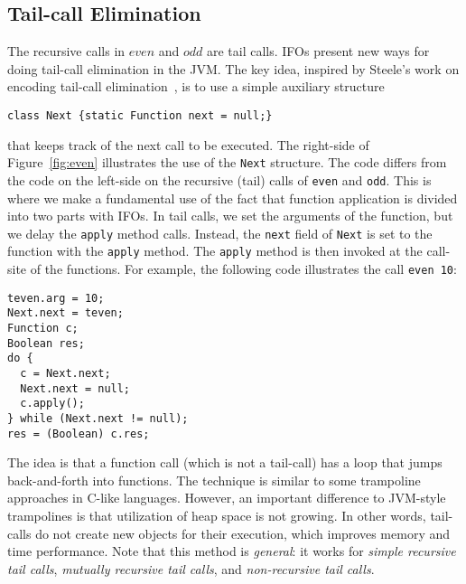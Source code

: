\subsection{Tail-call Elimination}

The recursive calls in $even$ and $odd$ are tail calls. 
IFOs present new ways for doing tail-call elimination in the JVM.
The key idea, inspired by Steele's work on encoding tail-call
elimination~\cite{Steele1978}, is to use a simple
auxiliary structure

\begin{lstlisting}
class Next {static Function next = null;}
\end{lstlisting}

\noindent that keeps track of the next call to be executed.  The
right-side of Figure~\ref{fig:even} illustrates the use of the
\lstinline{Next} structure. The code differs from the code on the
left-side on the recursive (tail) calls of \lstinline{even}
and \lstinline{odd}. This is where we make a fundamental use of the fact
that function application is divided into two parts with IFOs.
In tail calls, we set the arguments of the
function, but we delay the \lstinline{apply} method calls.
Instead, the \lstinline{next} field of \lstinline{Next} is set
to the function with the \lstinline{apply} method. The \lstinline{apply}
method is then invoked at the call-site of the functions. For example, 
the following code illustrates the call \lstinline{even 10}:

\begin{lstlisting}
teven.arg = 10;
Next.next = teven;
Function c;
Boolean res;
do {
  c = Next.next;
  Next.next = null;
  c.apply();
} while (Next.next != null);
res = (Boolean) c.res;
\end{lstlisting}

\noindent The idea is that a function call (which is not a tail-call) 
has a loop that jumps back-and-forth into functions. The technique 
is similar to some trampoline approaches in C-like languages. However, 
an important difference to JVM-style trampolines is that utilization of heap space is not growing.
In other words, tail-calls do not create new objects for their execution, which
improves memory and time performance.
Note that this method is \emph{general}: it works for \emph{simple recursive
tail calls}, \emph{mutually recursive tail calls}, and \emph{non-recursive tail calls}.

